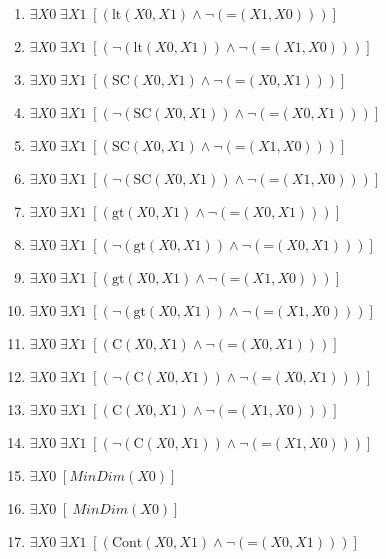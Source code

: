 \documentclass{article}
\begin{document}
\begin{enumerate}
\item $\exists X0\; \exists X1\;  \left[ \left(\textrm{lt}(X0,X1) \land \neg \left(\textrm{=}(X1,X0)\right)\right) \right]$
\item $\exists X0\; \exists X1\;  \left[ \left(\neg \left(\textrm{lt}(X0,X1)\right) \land \neg \left(\textrm{=}(X1,X0)\right)\right) \right]$
\item $\exists X0\; \exists X1\;  \left[ \left(\textrm{SC}(X0,X1) \land \neg \left(\textrm{=}(X0,X1)\right)\right) \right]$
\item $\exists X0\; \exists X1\;  \left[ \left(\neg \left(\textrm{SC}(X0,X1)\right) \land \neg \left(\textrm{=}(X0,X1)\right)\right) \right]$
\item $\exists X0\; \exists X1\;  \left[ \left(\textrm{SC}(X0,X1) \land \neg \left(\textrm{=}(X1,X0)\right)\right) \right]$
\item $\exists X0\; \exists X1\;  \left[ \left(\neg \left(\textrm{SC}(X0,X1)\right) \land \neg \left(\textrm{=}(X1,X0)\right)\right) \right]$
\item $\exists X0\; \exists X1\;  \left[ \left(\textrm{gt}(X0,X1) \land \neg \left(\textrm{=}(X0,X1)\right)\right) \right]$
\item $\exists X0\; \exists X1\;  \left[ \left(\neg \left(\textrm{gt}(X0,X1)\right) \land \neg \left(\textrm{=}(X0,X1)\right)\right) \right]$
\item $\exists X0\; \exists X1\;  \left[ \left(\textrm{gt}(X0,X1) \land \neg \left(\textrm{=}(X1,X0)\right)\right) \right]$
\item $\exists X0\; \exists X1\;  \left[ \left(\neg \left(\textrm{gt}(X0,X1)\right) \land \neg \left(\textrm{=}(X1,X0)\right)\right) \right]$
\item $\exists X0\; \exists X1\;  \left[ \left(\textrm{C}(X0,X1) \land \neg \left(\textrm{=}(X0,X1)\right)\right) \right]$
\item $\exists X0\; \exists X1\;  \left[ \left(\neg \left(\textrm{C}(X0,X1)\right) \land \neg \left(\textrm{=}(X0,X1)\right)\right) \right]$
\item $\exists X0\; \exists X1\;  \left[ \left(\textrm{C}(X0,X1) \land \neg \left(\textrm{=}(X1,X0)\right)\right) \right]$
\item $\exists X0\; \exists X1\;  \left[ \left(\neg \left(\textrm{C}(X0,X1)\right) \land \neg \left(\textrm{=}(X1,X0)\right)\right) \right]$
\item $\exists X0\;  \left[ MinDim(X0) \right]$
\item $\exists X0\;  \left[ ~MinDim(X0) \right]$
\item $\exists X0\; \exists X1\;  \left[ \left(\textrm{Cont}(X0,X1) \land \neg \left(\textrm{=}(X0,X1)\right)\right) \right]$

\end{enumerate}
\end{document}
